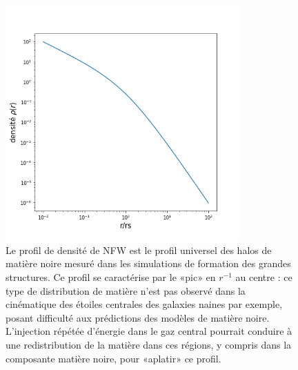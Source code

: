\begin{figure}[htbp]
	\centering
		\includegraphics[height=9cm]{figs/nfw.png}
		\caption[Le profil de densité NFW]{Le profil de densité de NFW est le profil universel des halos de matière noire mesuré dans les simulations de formation des grandes structures. Ce profil se caractérise par le «pic» en $r^{-1}$ au centre : ce type de distribution de matière n'est pas observé dans la cinématique des étoiles centrales des galaxies naines par exemple, posant difficulté aux prédictions des modèles de matière noire. L'injection répétée d'énergie dans le gaz central pourrait conduire à une redistribution de la matière dans ces régions, y compris dans la composante matière noire, pour «aplatir» ce profil.}
	\label{f:nfw}
\end{figure}

